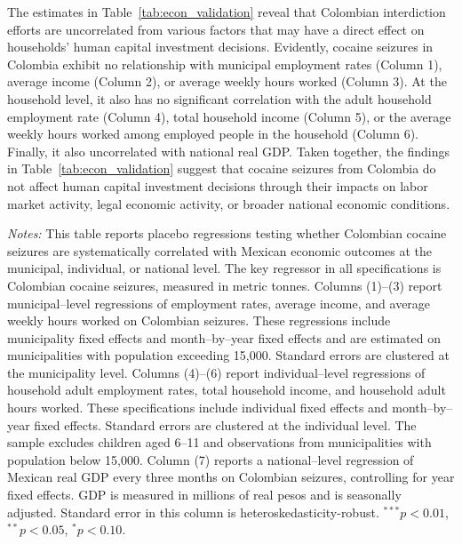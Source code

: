\documentclass[12pt,letter,english,intoc,bibliography=totoc,index=totoc,BCOR10mm,captions=tableheading,nottitlepage,fleqn]{article}
\theoremstyle{break}
\begin{document}
The estimates in Table~\ref{tab:econ_validation} reveal that Colombian interdiction efforts are uncorrelated from various factors that may have a direct effect on households' human capital investment decisions. Evidently, cocaine seizures in Colombia exhibit no relationship with municipal employment rates (Column 1), average income (Column 2), or average weekly hours worked (Column 3). At the household level, it also has no significant correlation with the adult household employment rate (Column 4), total household income (Column 5), or the average weekly hours worked among employed people in the household (Column 6). Finally, it also uncorrelated with national real GDP. Taken together, the findings in Table~\ref{tab:econ_validation} suggest that cocaine seizures from Colombia do not affect human capital investment decisions through their impacts on labor market activity, legal economic activity, or broader national economic conditions.  
\begin{table}[H]
\centering
\scriptsize
\caption{Correlation Between Colombian Seizures and Economic Indicators}
\label{tab:econ_validation}
\centering

\begin{minipage}{0.95\linewidth}
    \scriptsize \singlespacing
    \textit{Notes:} This table reports placebo regressions testing whether Colombian cocaine seizures are systematically correlated with Mexican economic outcomes at the municipal, individual, or national level. The key regressor in all specifications is Colombian cocaine seizures, measured in metric tonnes. Columns (1)--(3) report municipal--level regressions of employment rates, average income, and average weekly hours worked on Colombian seizures. These regressions include municipality fixed effects and month--by--year fixed effects and are estimated on municipalities with population exceeding 15,000. Standard errors are clustered at the municipality level. Columns (4)--(6) report individual--level regressions of household adult employment rates, total household income, and household adult hours worked. These specifications include individual fixed effects and month--by--year fixed effects. Standard errors are clustered at the individual level. The sample excludes children aged 6--11 and observations from municipalities with population below 15,000. Column (7) reports a national--level regression of Mexican real GDP every three months on Colombian seizures, controlling for year fixed effects. GDP is measured in millions of real pesos and is seasonally adjusted. Standard error in this column is heteroskedasticity-robust. $^{***}p<0.01$, $^{**}p<0.05$, $^{*}p<0.10$.
    \end{minipage}
\end{table}
\end{document}
